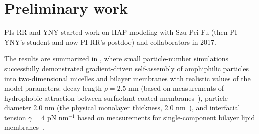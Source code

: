 \section{Preliminary work}
\label{sec:preliminary_work}
PIs RR and YNY started work on HAP modeling with Szu-Pei Fu (then PI YNY's student and now PI RR's postdoc) and collaborators in 2017. 
%
%
\begin{table}
\vspace{-5pt}
\caption{\label{tab:spectral_force} 
\footnotesize  Relative numerical errors (rel.~err.)$_F = \max_{i}
  \|\mathbf{F}_i-\mathbf{F}_i^{\text{exact}}\|/\|\mathbf{F}_i^{\text{exact}}\|$
  and (rel.~err.)$_G = \max_{i}
  \|\mathbf{G}_i-\mathbf{G}_i^{\text{exact}}\|/\|\mathbf{G}_i^{\text{exact}}\|$
  for force and torque respectively as a function of number of grid
  points $n$ per particle.  The data is for $N = 5$ particles; two of
  the particles are nearly touching at a distance 1\% of particle
  diameter.} 
\end{table}
The results are summarized in \cite{Fu2018_SIAM}, where
small particle-number simulations successfully demonstrated gradient-driven self-assembly of
amphiphilic particles into two-dimensional micelles and bilayer membranes with realistic values of
the model parameters:  decay length $\rho=2.5$ nm (based on measurements of
hydrophobic attraction between surfactant-coated
membranes~\cite{Eriksson1989, Lin2005, Parsegian, Israelachvili80}),
particle diameter 2.0 nm (the physical monolayer thickness, 2.0 nm~\cite{Boal}),
and interfacial tension $\gamma = 4$ pN nm$^{-1}$ based on
measurements for single-component bilayer lipid
membranes~\cite{GarciaSaez, KUZMIN2005, Petelska2012, Jackson2016}.

